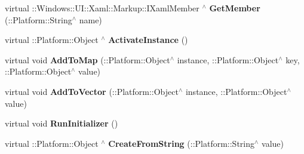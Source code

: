 \begin{DoxyCompactItemize}
virtual \+::Windows\+::\+U\+I\+::\+Xaml\+::\+Markup\+::\+I\+Xaml\+Member $^\wedge$ {\bfseries Get\+Member} (\+::Platform\+::\+String$^\wedge$ name)
\item 
\mbox{\label{class_xaml_type_info_1_1_info_provider_1_1_xaml_user_type_a6d0a15b5a83f03b7a37ebc450662a205}} 
virtual \+::Platform\+::\+Object $^\wedge$ {\bfseries Activate\+Instance} ()
\item 
\mbox{\label{class_xaml_type_info_1_1_info_provider_1_1_xaml_user_type_aa2d1cf0cc528940509545ebdeb61926c}} 
virtual void {\bfseries Add\+To\+Map} (\+::Platform\+::\+Object$^\wedge$ instance, \+::Platform\+::\+Object$^\wedge$ key, \+::Platform\+::\+Object$^\wedge$ value)
\item 
\mbox{\label{class_xaml_type_info_1_1_info_provider_1_1_xaml_user_type_a93b639b8ab3dd00a61776a99a0da3f54}} 
virtual void {\bfseries Add\+To\+Vector} (\+::Platform\+::\+Object$^\wedge$ instance, \+::Platform\+::\+Object$^\wedge$ value)
\item 
\mbox{\label{class_xaml_type_info_1_1_info_provider_1_1_xaml_user_type_a27ab5687ea814468d9382aa7e6502465}} 
virtual void {\bfseries Run\+Initializer} ()
\item 
\mbox{\label{class_xaml_type_info_1_1_info_provider_1_1_xaml_user_type_a889a00c934bfc7d5366f218dd3f50e48}} 
virtual \+::Platform\+::\+Object $^\wedge$ {\bfseries Create\+From\+String} (\+::Platform\+::\+String$^\wedge$ value)
\end{DoxyCompactItemize}

